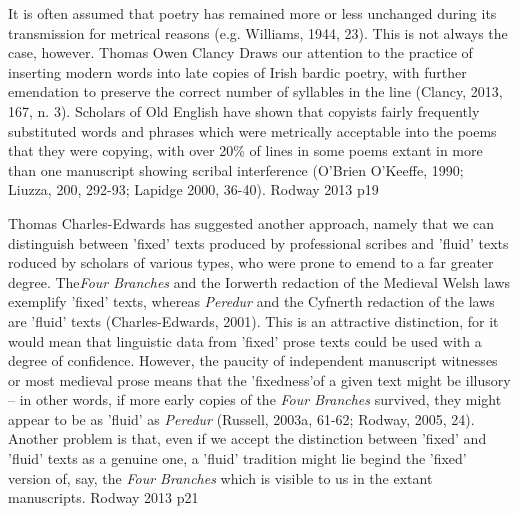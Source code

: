 
It is often assumed that poetry has remained more or less unchanged during its transmission for metrical reasons (e.g. Williams, 1944, 23). This is not always the case, however. Thomas Owen Clancy Draws our attention to the practice of inserting modern words into late copies of Irish bardic poetry, with further emendation to preserve the correct number of syllables in the line (Clancy, 2013, 167, n. 3). Scholars of Old English have shown that copyists fairly frequently substituted words and phrases which were metrically acceptable into the poems that they were copying, with over 20\% of lines in some poems extant in more than one manuscript showing scribal interference (O'Brien O'Keeffe, 1990; Liuzza, 200, 292-93; Lapidge 2000, 36-40).
Rodway 2013 p19

Thomas Charles-Edwards has suggested another approach, namely that we can distinguish between 'fixed' texts produced by professional scribes and 'fluid' texts roduced by scholars of various types, who were prone to emend to a far greater degree. The\textit{Four Branches} and the Iorwerth redaction of the Medieval Welsh laws exemplify 'fixed' texts, whereas \textit{Peredur} and the Cyfnerth redaction of the laws are 'fluid' texts (Charles-Edwards, 2001). This is an attractive distinction, for it would mean that linguistic data from 'fixed' prose texts could be used with a degree of confidence. However, the paucity of independent manuscript witnesses or most medieval prose means that the 'fixedness'of a given text might be illusory -- in other words, if more early copies of the \textit{Four Branches}  survived, they might appear to be as 'fluid' as \textit{Peredur} (Russell, 2003a, 61-62; Rodway, 2005, 24). Another problem is that, even if we accept the distinction between 'fixed' and 'fluid' texts as a genuine one, a 'fluid' tradition might lie begind the 'fixed' version of, say, the \textit{Four Branches} which is visible to us in the extant manuscripts.
Rodway 2013 p21

